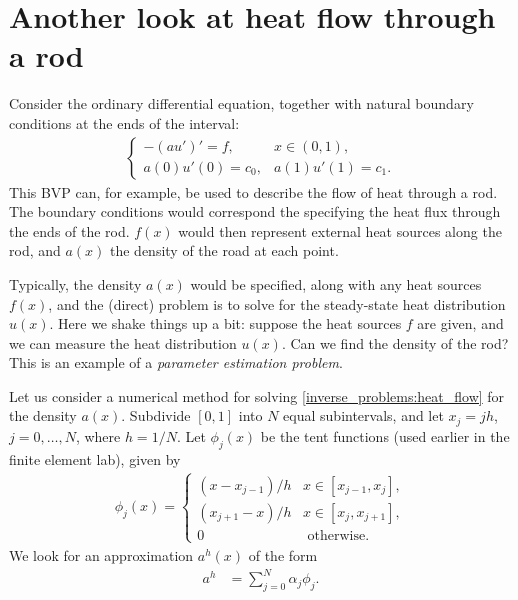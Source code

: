 \section*{Another look at heat flow through a rod}
Consider the ordinary differential equation, together with natural boundary conditions at the ends of the interval: 
\begin{align}
\begin{cases}
	-(au')' = f, & x \in (0,1),\\
	a(0)u'(0) = c_0, & a(1)u'(1) = c_1.
\end{cases} \label{inverse_problems:heat_flow}
\end{align}
This BVP can, for example, be used to describe the flow of heat through a rod. The boundary conditions would correspond the specifying the heat flux through the ends of the rod. $f(x)$ would then represent external heat sources along the rod, and $a(x)$ the density of the road at each point. 

Typically, the density $a(x)$ would be specified, along with any heat sources $f(x)$, and the (direct) problem is to solve for the steady-state heat distribution $u(x)$. Here we shake things up a bit: suppose the heat sources $f$ are given, and we can measure the heat distribution $u(x)$. Can we find the density of the rod? This is an example of a \textit{parameter estimation problem}.

Let us consider a numerical method for solving \eqref{inverse_problems:heat_flow} for the density $a(x)$.
Subdivide $[0,1]$ into $N$ equal subintervals, and let $x_j = jh$, $j = 0, \ldots,N$, where $h = 1/N$.
Let $\phi_j(x)$ be the tent functions (used earlier in the finite element lab), given by 
\begin{align*}
	\phi_j(x) = \begin{cases}
(x - x_{j-1})/h  &  x \in [x_{j-1},x_j],\\
 (x_{j+1} - x)/h  &  x \in [x_{j},x_{j+1}],\\
0 & \text{ otherwise.}
\end{cases}
\end{align*}
We look for an approximation $a^h(x)$ of the form 
\begin{align}
	a^h &= \sum_{j=0}^N \alpha_j \phi_j. \label{inverse_problems:approximate}
\end{align}


